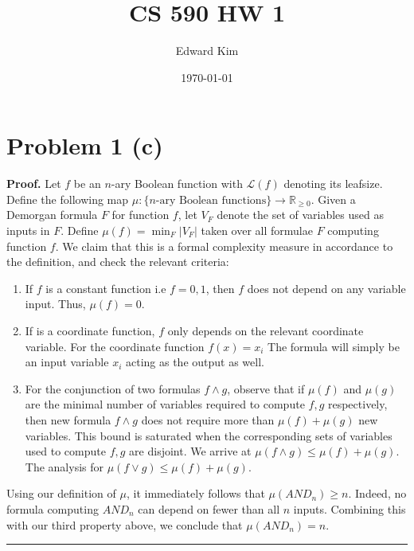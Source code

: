 \documentclass[12pt]{article}%
\newenvironment{proof}[1][Proof]{\textbf{#1.} }{\ \rule{0.5em}{0.5em}}
\begin{document}
\title{CS 590 HW 1}
\author{Edward Kim}
\date{\today}
\maketitle

\section{Problem 1 (c)}
\begin{proof}
  Let $f$ be an $n$-ary Boolean function with $\mathcal{L}(f)$ denoting its leafsize. Define the following map $\mu:\{n \text{-ary Boolean functions}\} \rightarrow \mathbb{R}_{\geq 0}$. Given a Demorgan formula $F$ for function $f$, let $V_F$ denote the set of variables used as inputs in $F$. Define $\mu(f) = \min_{F} |V_F|$ taken over all formulae $F$ computing function $f$. We claim that this is a formal complexity measure in accordance to the definition, and check the relevant criteria:
  \begin{enumerate}
    \item If $f$ is a constant function i.e $ f = 0, 1$, then $f$ does not depend on any variable input. Thus, $\mu(f) = 0$.
    \item If is a coordinate function, $f$ only depends on the relevant coordinate variable. For the coordinate function $f(x) = x_i$ The formula will simply be an input variable $x_i$ acting as the output as well.
    \item For the conjunction of two formulas $f \wedge g$, observe that if $\mu(f)$ and $\mu(g)$ are the minimal number of variables required to compute $f,g$ respectively, then new formula $f \wedge g$ does not require more than $\mu(f) + \mu(g)$ new variables. This bound is saturated when the corresponding sets of variables used to compute $f,g$ are disjoint. We arrive at $\mu(f \wedge g) \leq \mu(f) + \mu(g)$. The analysis for $\mu(f \vee g) \leq \mu(f) + \mu(g)$.
  \end{enumerate}
  Using our definition of $\mu$, it immediately follows that $\mu(AND_n) \geq n$. Indeed, no formula computing $AND_n$ can depend on fewer than all $n$ inputs. Combining this with our third property above, we conclude that $\mu(AND_n) = n$.
\end{proof}
\end{document}
